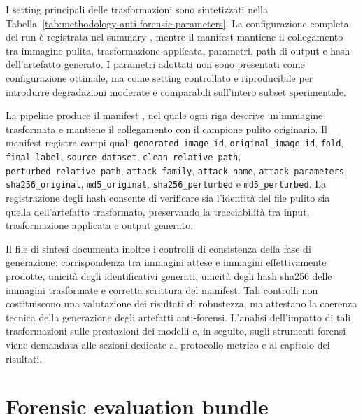 I setting principali delle trasformazioni sono sintetizzati nella
Tabella~\ref{tab:methodology-anti-forensic-parameters}. La configurazione
completa del run è registrata nel summary
, mentre il
manifest 
mantiene il collegamento tra immagine pulita, trasformazione applicata,
parametri, path di output e hash dell'artefatto generato. I parametri adottati
non sono presentati come configurazione ottimale, ma come setting controllato e
riproducibile per introdurre degradazioni moderate e comparabili sull'intero
subset sperimentale.

La pipeline produce il manifest
, nel quale ogni
riga descrive un'immagine trasformata e mantiene il collegamento con il campione
pulito originario. Il manifest registra campi quali
\texttt{generated\_image\_id}, \texttt{original\_image\_id}, \texttt{fold},
\texttt{final\_label}, \texttt{source\_dataset}, \texttt{clean\_relative\_path},
\texttt{perturbed\_relative\_path}, \texttt{attack\_family},
\texttt{attack\_name}, \texttt{attack\_parameters}, \texttt{sha256\_original},
\texttt{md5\_original}, \texttt{sha256\_perturbed} e
\texttt{md5\_perturbed}. La registrazione degli hash consente di verificare sia
l'identità del file pulito sia quella dell'artefatto trasformato, preservando la
tracciabilità tra input, trasformazione applicata e output generato.

Il file di sintesi documenta inoltre i controlli di consistenza della fase di
generazione: corrispondenza tra immagini attese e immagini effettivamente
prodotte, unicità degli identificativi generati, unicità degli hash \gls{sha256} delle
immagini trasformate e corretta scrittura del manifest. Tali controlli non
costituiscono una valutazione dei risultati di robustezza, ma attestano la
coerenza tecnica della generazione degli artefatti anti-forensi. L'analisi
dell'impatto di tali trasformazioni sulle prestazioni dei modelli e, in seguito,
sugli strumenti forensi viene demandata alle sezioni dedicate al
protocollo metrico e al capitolo dei risultati.

\section{Forensic evaluation bundle}
\label{sec:methodology-forensic-evaluation-bundle}

